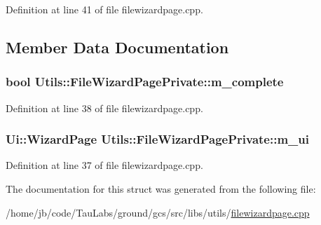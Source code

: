 \-Definition at line 41 of file filewizardpage.\-cpp.



\subsection{\-Member \-Data \-Documentation}
\hypertarget{struct_utils_1_1_file_wizard_page_private_a5611beabbe4ad84ed8e0fbb836ef2f53}{
\subsubsection[{m\-\_\-complete}]{\setlength{\rightskip}{0pt plus 5cm}bool {\bf \-Utils\-::\-File\-Wizard\-Page\-Private\-::m\-\_\-complete}}}\label{struct_utils_1_1_file_wizard_page_private_a5611beabbe4ad84ed8e0fbb836ef2f53}


\-Definition at line 38 of file filewizardpage.\-cpp.

\hypertarget{struct_utils_1_1_file_wizard_page_private_a19e77ffae3aabb4c49b889cce18563fb}{
\subsubsection[{m\-\_\-ui}]{\setlength{\rightskip}{0pt plus 5cm}\-Ui\-::\-Wizard\-Page {\bf \-Utils\-::\-File\-Wizard\-Page\-Private\-::m\-\_\-ui}}}\label{struct_utils_1_1_file_wizard_page_private_a19e77ffae3aabb4c49b889cce18563fb}


\-Definition at line 37 of file filewizardpage.\-cpp.



\-The documentation for this struct was generated from the following file\-:\begin{DoxyCompactItemize}
\item 
/home/jb/code/\-Tau\-Labs/ground/gcs/src/libs/utils/\hyperlink{filewizardpage_8cpp}{filewizardpage.\-cpp}\end{DoxyCompactItemize}
